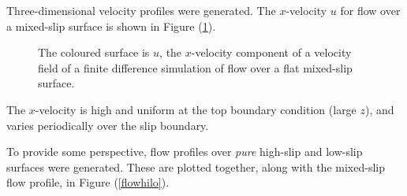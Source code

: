 \documentclass[12pt, a4paper, twoside, openright]{book}
\begin{document}
Three-dimensional velocity profiles were generated.  The $x$-velocity $u$ for flow over a mixed-slip surface is shown in Figure (\ref{flow}).

\begin{figure}[ht]
\centering
{}
\caption{The coloured surface is $u$, the $x$-velocity component of a velocity field of a finite difference simulation of flow over a flat mixed-slip surface.}\label{flow}
\end{figure}


The $x$-velocity is high and uniform at the top boundary condition (large $z$), and varies periodically over the slip boundary.

\clearpage
To provide some perspective, flow profiles over \emph{pure} high-slip and low-slip surfaces were generated.  These are plotted together, along with the mixed-slip flow profile, in Figure (\ref{flowhilo}).
\end{document}
